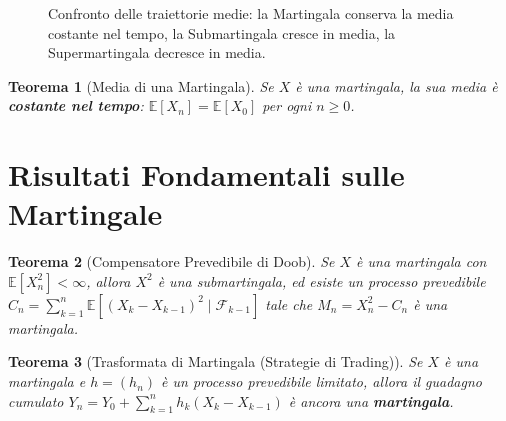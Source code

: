 \documentclass[11pt, a4paper]{report}
\theoremstyle{plain}
\newtheorem{theorem}{Teorema}[chapter]
\theoremstyle{definition}
\theoremstyle{remark}
\newcommand{\E}{\mathbb{E}}
\newcommand{\F}{\mathcal{F}}
\newcommand{\1}{\mathbf{1}}
\begin{document}
\begin{figure}[htbp]
\centering
{}
\caption{Confronto delle traiettorie medie: la Martingala conserva la media costante nel tempo, la Submartingala cresce in media, la Supermartingala decresce in media.}
\label{fig:martingale}
\end{figure}

\begin{theorem}[Media di una Martingala]
Se $X$ è una martingala, la sua media è \textbf{costante nel tempo}: $\E[X_n] = \E[X_0]$ per ogni $n \ge 0$.
\end{theorem}

\section{Risultati Fondamentali sulle Martingale}

\begin{theorem}[Compensatore Prevedibile di Doob]
Se $X$ è una martingala con $\E[X_n^2] < \infty$, allora $X^2$ è una submartingala, ed esiste un processo prevedibile $C_n = \sum_{k=1}^n \E[(X_k - X_{k-1})^2 \mid \F_{k-1}]$ tale che $M_n = X_n^2 - C_n$ è una martingala.
\end{theorem}

\begin{theorem}[Trasformata di Martingala (Strategie di Trading)]
Se $X$ è una martingala e $h = (h_n)$ è un processo prevedibile limitato, allora il guadagno cumulato $Y_n = Y_0 + \sum_{k=1}^n h_k (X_k - X_{k-1})$ è ancora una \textbf{martingala}.
\end{theorem}
\end{document}
